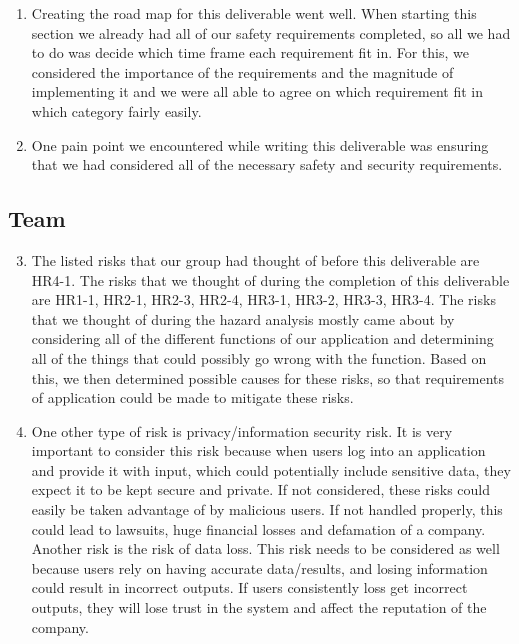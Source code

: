 \documentclass{article}
\begin{document}
\begin{enumerate}
    \item Creating the road map for this deliverable went well. When starting this section we already had all of our safety requirements completed, so all we had to do was decide which time frame each requirement fit in. For this, we considered the importance of the requirements and the magnitude of implementing it and we were all able to agree on which requirement fit in which category fairly easily. 
    \item One pain point we encountered while writing this deliverable was ensuring that we had considered all of the necessary safety and security requirements. 
\end{enumerate}  

\subsection*{Team}

\begin{enumerate}
\setcounter{enumi}{2}
    \item The listed risks that our group had thought of before this deliverable are HR4-1. The risks that we thought of during the completion of this deliverable are HR1-1, HR2-1,  HR2-3, HR2-4, HR3-1, HR3-2, HR3-3, HR3-4. The risks that we thought of during the hazard analysis mostly came about by considering all of the different functions of our application and determining all of the things that could possibly go wrong with the function. Based on this, we then determined possible causes for these risks, so that requirements of application could be made to mitigate these risks.
    \item One other type of risk is privacy/information security risk. It is very important to consider this risk because when users log into an application and provide it with input, which could potentially include sensitive data, they expect it to be kept secure and private. If not considered, these risks could easily be taken advantage of by malicious users. If not handled properly, this could lead to lawsuits, huge financial losses and defamation of a company. Another risk is the risk of data loss. This risk needs to be considered as well because users rely on having accurate data/results, and losing information could result in incorrect outputs. If users consistently loss get incorrect outputs, they will lose trust in the system and affect the reputation of the company. 
\end{enumerate} 
\end{document}
